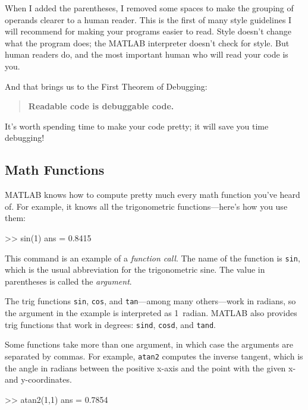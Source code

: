 \documentclass[../../book.tex]{subfiles}
\begin{document}
When I added the parentheses, I removed some spaces to make the
grouping of operands clearer to a human reader.  This is the first
of many style guidelines I will recommend for making your programs
easier to read.  Style doesn't change what the program does; the MATLAB
interpreter doesn't check for style.  But human readers do, and the
most important human who will read your code is you.


And that brings us to the First Theorem of Debugging:

\begin{quote}
\textbf{Readable code is debuggable code.}
\end{quote}

It's worth spending time to make your code pretty; it will save
you time \mbox{debugging}!


\subsection{Math Functions}

MATLAB knows how to compute pretty much every math function you've
heard of. For example, it knows all the trigonometric functions---here's how you
use them:


\begin{code}
>> sin(1)
ans = 0.8415
\end{code}

This command is an example of a \emph{function call}.  The name of the
function is \lstinline{sin}, which is the usual abbreviation for the
trigonometric sine.  The value in parentheses is called the \emph{argument}.
%
%

The trig functions \lstinline{sin}, \lstinline{cos}, and  \lstinline{tan}---among many
others---work in radians, so the argument in the example is interpreted as 1~radian.
MATLAB also provides trig functions that work in degrees: \lstinline{sind}, \lstinline{cosd}, and \lstinline{tand}.

Some functions take more than one argument, in which case the arguments are
separated by commas.  For example, \lstinline{atan2} computes the inverse
tangent, which is the angle in radians between the positive x-axis and
the point with the given x- and y-coordinates.

\begin{code}
>> atan2(1,1)
ans = 0.7854
\end{code}
\end{document}
